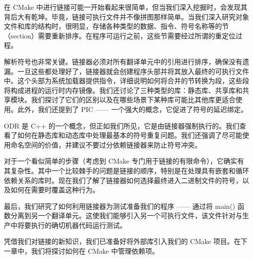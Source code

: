 在 CMake 中进行链接可能一开始看起来很简单，但当我们深入挖掘时，会发现其背后大有乾坤。毕竟，链接可执行文件并不像拼图那样简单。当我们深入研究对象文件和库的结构时，很明显，存储各种类型的数据、指令、符号名称等的节（section）需要重新排序。在程序可运行之前，这些节需要经过所谓的重定位过程。

解析符号也非常关键。链接器必须对所有翻译单元中的引用进行排序，确保没有遗漏。一旦这些都处理好了，链接器就会创建程序头部并将其放入最终的可执行文件中。这个头部为系统加载器提供指令，详细说明如何将合并的节转换为段，这些段将构成进程的运行时内存镜像。我们还讨论了三种类型的库：静态库、共享库和共享模块。我们探讨了它们的区别以及在哪些场景下某种库可能比其他库更适合使用。此外，我们还提到了 PIC —— 一个强大的概念，它促进了符号的延迟绑定。

ODR 是 C++ 的一个概念，但正如我们所见，它是由链接器强制执行的。我们查看了如何在静态库和动态库中处理最基本的符号重复问题。我们还强调了尽可能使用命名空间的价值，并建议不要过分依赖链接器来防止符号冲突。

对于一个看似简单的步骤（考虑到 CMake 专门用于链接的有限命令），它确实有其复杂性。其中一个比较棘手的问题是链接的顺序，特别是在处理具有嵌套和循环依赖关系的库时。现在我们了解了链接器如何选择最终进入二进制文件的符号，以及如何在需要时覆盖这种行为。

最后，我们研究了如何利用链接器为测试准备我们的程序 —— 通过将 main() 函数分离到另一个翻译单元。这使我们能够引入另一个可执行文件，该文件针对与生产中将要执行的确切机器代码运行测试。

凭借我们对链接的新知识，我们已准备好将外部库引入我们的 CMake 项目。在下一章中，我们将探讨如何在 CMake 中管理依赖项。